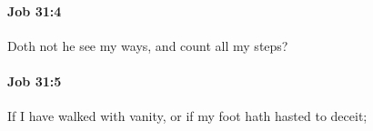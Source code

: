 		\paragraph{Job 31:4} %
			\label{JOB-31-4}

			Doth not he see my ways, and count all my steps?


		\paragraph{Job 31:5} %
			\label{JOB-31-5}

			If I have walked with vanity, or if my foot hath hasted to deceit;


